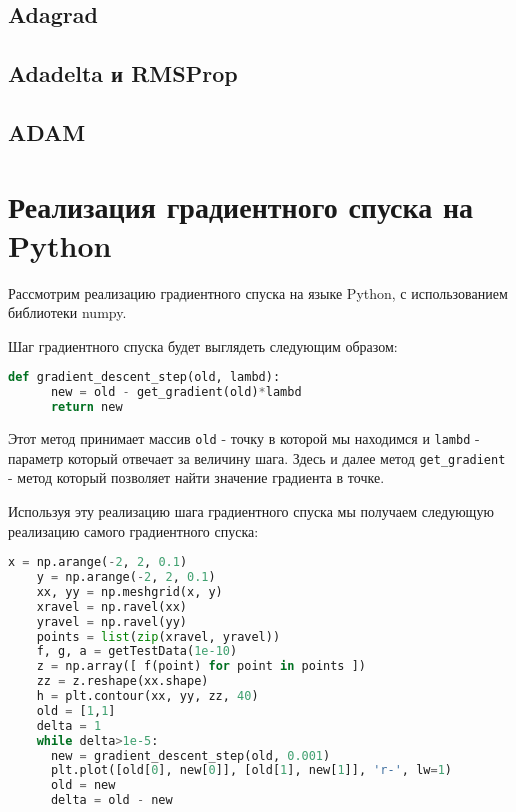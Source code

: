 \documentclass[12pt]{report}
\begin{document}
  \section{Adagrad}
  \section{Adadelta и RMSProp}
  \section{ADAM}

  \chapter{Реализация градиентного спуска на Python}
  Рассмотрим реализацию градиентного спуска на языке Python, с использованием
  библиотеки numpy.

  Шаг градиентного спуска будет выглядеть следующим образом:

  \begin{lstlisting}[language=Python, frame=single]
    def gradient_descent_step(old, lambd):
      new = old - get_gradient(old)*lambd
      return new
  \end{lstlisting}

  Этот метод принимает массив \verb|old| - точку в которой мы находимся и
  \verb|lambd| - параметр который отвечает за величину шага. Здесь и далее метод
  \verb|get_gradient| - метод который позволяет найти значение градиента в точке.

  Используя эту реализацию шага градиентного спуска мы получаем следующую
  реализацию самого градиентного спуска:

  \begin{lstlisting}[language=Python, frame=single]
    x = np.arange(-2, 2, 0.1)
    y = np.arange(-2, 2, 0.1)
    xx, yy = np.meshgrid(x, y)
    xravel = np.ravel(xx)
    yravel = np.ravel(yy)
    points = list(zip(xravel, yravel))
    f, g, a = getTestData(1e-10)
    z = np.array([ f(point) for point in points ])
    zz = z.reshape(xx.shape)
    h = plt.contour(xx, yy, zz, 40)
    old = [1,1]
    delta = 1
    while delta>1e-5:
      new = gradient_descent_step(old, 0.001)
      plt.plot([old[0], new[0]], [old[1], new[1]], 'r-', lw=1)
      old = new
      delta = old - new
  \end{lstlisting}
\end{document}
